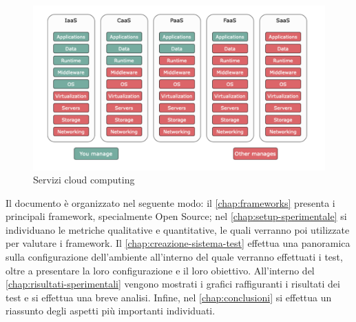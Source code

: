 \documentclass[12pt,a4paper,openany,twoside]{book}
\begin{document}
\begin{figure}[ht]
    \centering
    \includegraphics[width=\linewidth]{figures/IaaS_PaaS_FaaS.pdf}
    \caption{Servizi cloud computing}
    \label{fig:servizi-cloud-computing}
\end{figure}

\noindent
Il documento è organizzato nel seguente modo: il \cref{chap:frameworks} presenta i principali framework, specialmente Open Source; nel \cref{chap:setup-sperimentale} si individuano le metriche qualitative e quantitative, le quali verranno poi utilizzate per valutare i framework. Il \cref{chap:creazione-sistema-test} effettua una panoramica sulla configurazione dell'ambiente all'interno del quale verranno effettuati i test, oltre a presentare la loro configurazione e il loro obiettivo. All'interno del \cref{chap:risultati-sperimentali} vengono mostrati i grafici raffiguranti i risultati dei test e si effettua una breve analisi. Infine, nel \cref{chap:conclusioni} si effettua un riassunto degli aspetti più importanti individuati.



\end{document}
